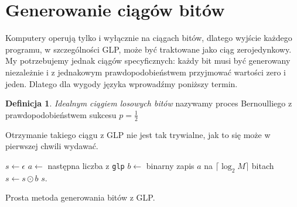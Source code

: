 \documentclass[a4paper,11pt,oneside]{book}
\newcommand{\ceil}[1]{\lceil#1\rceil}
\theoremstyle{definition}
\newtheorem{mydef}{Definicja}[chapter]
\begin{document}
\section{Generowanie ciągów bitów}
Komputery operują tylko i wyłącznie na ciągach bitów, dlatego wyjście każdego programu, w szczególności GLP, może być traktowane jako ciąg zerojedynkowy. My potrzebujemy jednak ciągów specyficznych: każdy bit musi być generowany niezależnie i z jednakowym prawdopodobieństwem przyjmować wartości zero i jeden. Dlatego dla wygody języka wprowadźmy poniższy termin.
\begin{mydef}
 \textit{Idealnym ciągiem losowych bitów} nazywamy proces Bernoulliego z prawdopodobieństwem sukcesu $p = \frac{1}{2}$
\end{mydef}
\noindent Otrzymanie takiego ciągu z GLP nie jest tak trywialne, jak to się może w pierwszej chwili wydawać.

\begin{algorithm}
 \begin{algorithmic}[1]
    \State $s \gets \epsilon$
      \State $a \gets$ następna liczba z \texttt{glp}
      \State $b \gets$ binarny zapis $a$ na $\ceil{\log_2 M}$ bitach
      \State $s \gets s \odot b$
     \EndWhile
    \State \Return $s$.
  \EndFunction
 \end{algorithmic}
 \caption{Prosta metoda generowania bitów z GLP.}
 \label{alg:GenerateBitSequence}
\end{algorithm}

\end{document}
